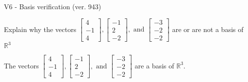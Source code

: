 \begin{exercise}
  \begin{exerciseTitle}V6 - Basis verification (ver. 943)\end{exerciseTitle}
  \begin{exerciseStatement}
    Explain why the vectors \(\left[\begin{array}{r}
4 \\
-1 \\
4
\end{array}\right] , \left[\begin{array}{r}
-1 \\
2 \\
-2
\end{array}\right] , \text{ and } \left[\begin{array}{r}
-3 \\
-2 \\
-2
\end{array}\right]\) are or are not a basis of \(\mathbb{R}^3\)	


  \end{exerciseStatement}
  \begin{exerciseAnswer}
   The vectors \(\left[\begin{array}{r}
4 \\
-1 \\
4
\end{array}\right] , \left[\begin{array}{r}
-1 \\
2 \\
-2
\end{array}\right] , \text{ and } \left[\begin{array}{r}
-3 \\
-2 \\
-2
\end{array}\right]\) 
  	 are  a basis of \(\mathbb{R}^3\).
  


  \end{exerciseAnswer}
\end{exercise}